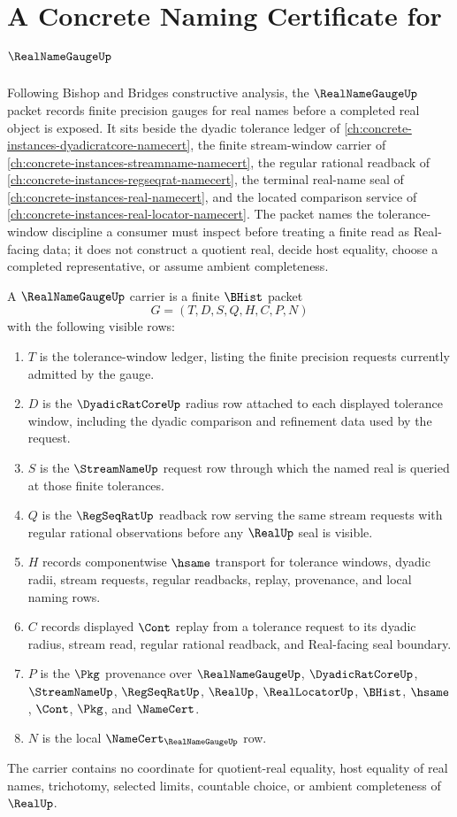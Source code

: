 \chapter{A Concrete Naming Certificate for $\RealNameGaugeUp$}
\label{ch:concrete-instances-real-name-gauge-namecert}

Following Bishop and Bridges constructive analysis, the $\RealNameGaugeUp$ packet records finite precision gauges for real names before a completed real object is exposed. It sits beside the dyadic tolerance ledger of \autoref{ch:concrete-instances-dyadicratcore-namecert}, the finite stream-window carrier of \autoref{ch:concrete-instances-streamname-namecert}, the regular rational readback of \autoref{ch:concrete-instances-regseqrat-namecert}, the terminal real-name seal of \autoref{ch:concrete-instances-real-namecert}, and the located comparison service of \autoref{ch:concrete-instances-real-locator-namecert}. The packet names the tolerance-window discipline a consumer must inspect before treating a finite read as Real-facing data; it does not construct a quotient real, decide host equality, choose a completed representative, or assume ambient completeness.

\begin{definition}
\label{def:real-name-gauge-carrier}
A $\RealNameGaugeUp$ carrier is a finite $\BHist$ packet
$$
G=(T,D,S,Q,H,C,P,N)
$$
with the following visible rows:
\begin{enumerate}
\item $T$ is the tolerance-window ledger, listing the finite precision requests currently admitted by the gauge.
\item $D$ is the $\DyadicRatCoreUp$ radius row attached to each displayed tolerance window, including the dyadic comparison and refinement data used by the request.
\item $S$ is the $\StreamNameUp$ request row through which the named real is queried at those finite tolerances.
\item $Q$ is the $\RegSeqRatUp$ readback row serving the same stream requests with regular rational observations before any $\RealUp$ seal is visible.
\item $H$ records componentwise $\hsame$ transport for tolerance windows, dyadic radii, stream requests, regular readbacks, replay, provenance, and local naming rows.
\item $C$ records displayed $\Cont$ replay from a tolerance request to its dyadic radius, stream read, regular rational readback, and Real-facing seal boundary.
\item $P$ is the $\Pkg$ provenance over $\RealNameGaugeUp$, $\DyadicRatCoreUp$, $\StreamNameUp$, $\RegSeqRatUp$, $\RealUp$, $\RealLocatorUp$, $\BHist$, $\hsame$, $\Cont$, $\Pkg$, and $\NameCert$.
\item $N$ is the local $\NameCert_{\RealNameGaugeUp}$ row.
\end{enumerate}
The carrier contains no coordinate for quotient-real equality, host equality of real names, trichotomy, selected limits, countable choice, or ambient completeness of $\RealUp$.
\end{definition}

